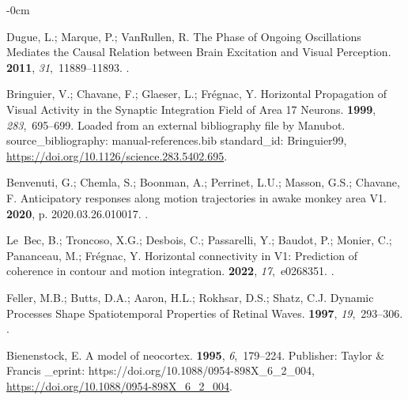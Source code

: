 \documentclass[brainsci, %
               review,submit,pdftex,moreauthors
               ]{Definitions/mdpi}
\begin{document}
\begin{adjustwidth}{-\extralength}{0cm}
\begin{thebibliography}{999}
  Dugue, L.; Marque, P.; VanRullen, R.
  \newblock The {Phase} of {Ongoing} {Oscillations} {Mediates} the {Causal}
    {Relation} between {Brain} {Excitation} and {Visual} {Perception}.
   {\bf 2011}, {\em 31},~11889--11893.
  .
  
  Bringuier, V.; Chavane, F.; Glaeser, L.; Frégnac, Y.
  \newblock Horizontal {Propagation} of {Visual} {Activity} in the {Synaptic}
    {Integration} {Field} of {Area} 17 {Neurons}.
   {\bf 1999}, {\em 283},~695--699.
   Loaded from an external bibliography file by Manubot.
    source\_bibliography: manual-references.bib standard\_id: Bringuier99,
    {\url{https://doi.org/10.1126/science.283.5402.695}}.
  
  Benvenuti, G.; Chemla, S.; Boonman, A.; Perrinet, L.U.; Masson, G.S.; Chavane,
    F.
  \newblock Anticipatory responses along motion trajectories in awake monkey area
    {V1}.
   {\bf 2020}, p.
    2020.03.26.010017.
  .
  
  Le~Bec, B.; Troncoso, X.G.; Desbois, C.; Passarelli, Y.; Baudot, P.; Monier,
    C.; Pananceau, M.; Frégnac, Y.
  \newblock Horizontal connectivity in {V1}: {Prediction} of coherence in contour
    and motion integration.
   {\bf 2022}, {\em 17},~e0268351.
  .
  
  Feller, M.B.; Butts, D.A.; Aaron, H.L.; Rokhsar, D.S.; Shatz, C.J.
  \newblock Dynamic {Processes} {Shape} {Spatiotemporal} {Properties} of
    {Retinal} {Waves}.
   {\bf 1997}, {\em 19},~293--306.
  .
  
  Bienenstock, E.
  \newblock A model of neocortex.
   {\bf 1995}, {\em
    6},~179--224.
  \newblock Publisher: Taylor \& Francis \_eprint:
    https://doi.org/10.1088/0954-898X\_6\_2\_004,
    {\url{https://doi.org/10.1088/0954-898X_6_2_004}}.
  

\end{thebibliography}
\end{adjustwidth}
\end{document}
